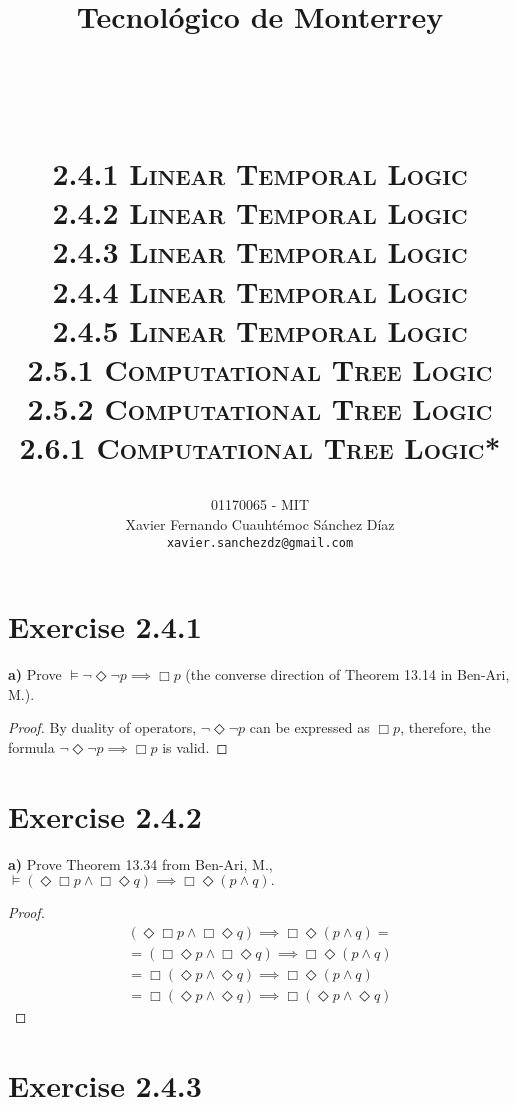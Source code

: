 \documentclass[titlepage, letterpaper, fleqn]{article}
\title{
\vspace{1in}
\textbf{Tecnológico de Monterrey} \\
\vspace{0.5in}
\textmd{\mahclass} \\
\large{\textit{\mahteacher}} \\
\vspace{0.5in}
\textsc{\mahtitle}\\
\textsc{2.4.1 Linear Temporal Logic}\\
\textsc{2.4.2 Linear Temporal Logic}\\
\textsc{2.4.3 Linear Temporal Logic}\\
\textsc{2.4.4 Linear Temporal Logic}\\
\textsc{2.4.5 Linear Temporal Logic}\\
\textsc{2.5.1 Computational Tree Logic}\\
\textsc{2.5.2 Computational Tree Logic}\\
\textsc{2.6.1 Computational Tree Logic*}\\
\author{01170065  - MIT \\
Xavier Fernando Cuauhtémoc Sánchez Díaz \\
\texttt{xavier.sanchezdz@gmail.com}}
\date{\mahdate}
}
\newcommand{\spacepls}{\vspace{5mm}}
\begin{document}
\begin{titlepage}
\maketitle
\end{titlepage}

%
%

\section{Exercise 2.4.1}

{\large \textbf{a)} Prove \(\models \neg \Diamond \neg p \implies \Box p\) (the converse direction of Theorem 13.14 in Ben-Ari, M.).}

\spacepls

\begin{proof}
By duality of operators, \(\neg \Diamond \neg p\) can be expressed as \(\Box p\), therefore, the formula \(\neg \Diamond \neg p \implies \Box p\) is valid.
\end{proof}

\section{Exercise 2.4.2}

{\large \textbf{a)} Prove Theorem 13.34 from Ben-Ari, M., \(\models (\Diamond \Box p \wedge \Box \Diamond q) \implies \Box \Diamond(p \wedge q).\)}

\spacepls

\begin{proof}
\begin{align*}
& (\Diamond \Box p \wedge \Box \Diamond q) \implies \Box \Diamond (p \wedge q) = &
\\ & = (\Box \Diamond p \wedge \Box \Diamond q) \implies \Box \Diamond (p \wedge q) & \tag*{Commutativity of $\Diamond \Box$}
\\ & = \Box (\Diamond p \wedge \Diamond q) \implies \Box \Diamond (p \wedge q) & \tag*{$\Box$ distributes over $\wedge$}
\\ & = \Box (\Diamond p \wedge \Diamond q) \implies \Box (\Diamond p \wedge \Diamond q) & \tag*{$\Diamond$ distributes over $\wedge$ in this direction}
\end{align*}
\end{proof}

\section{Exercise 2.4.3}
\end{document}
